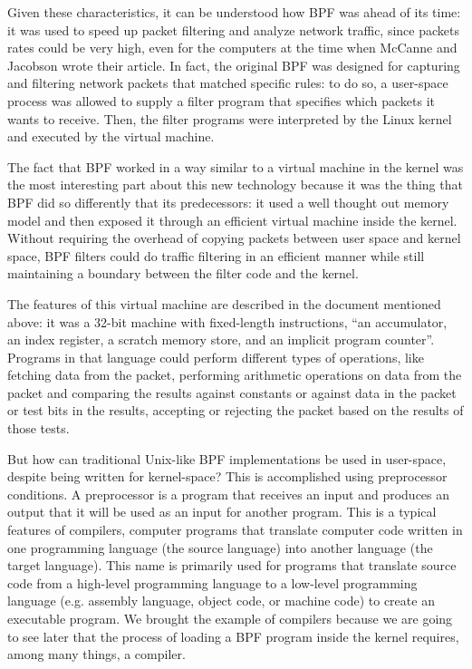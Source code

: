 Given these characteristics, it can be understood how BPF was ahead of its time: it was used to speed up packet filtering and analyze network traffic, since packets rates could be very high, even for the computers at the time when McCanne and Jacobson wrote their article. 
In fact, the original BPF was designed for capturing and filtering network packets that matched specific rules: to do so, a user-space process was allowed to supply a filter program that specifies which packets it wants to receive.
Then, the filter programs were interpreted by the Linux kernel and executed by the virtual machine.

The fact that BPF worked in a way similar to a virtual machine in the kernel was the most interesting part about this new technology because it was the thing that BPF did so differently that its predecessors: it used a well thought out memory model and then exposed it through an efficient virtual machine inside the kernel. 
Without requiring the overhead of copying packets between user space and kernel space, BPF filters could do traffic filtering in an efficient manner while still maintaining a boundary between the filter code and the kernel.

The features of this virtual machine are described in the document mentioned above: it was a 32-bit machine with fixed-length instructions, ``an accumulator, an index register, a scratch memory store, and an implicit program counter''.
Programs in that language could perform different types of operations, like fetching data from the packet, performing arithmetic operations on data from the packet and comparing the results against constants or against data in the packet or test bits in the results, accepting or rejecting the packet based on the results of those tests.

But how can traditional Unix-like BPF implementations be used in user-space, despite being written for kernel-space? 
This is accomplished using preprocessor conditions.
A preprocessor is a program that receives an input and produces an output that it will be used as an input for another program.
This is a typical features of compilers, computer programs that translate computer code written in one programming language (the source language) into another language (the target language). 
This name is primarily used for programs that translate source code from a high-level programming language to a low-level programming language (e.g. assembly language, object code, or machine code) to create an executable program.
We brought the example of compilers because we are going to see later that the process of loading a BPF program inside the kernel requires, among many things, a compiler.

